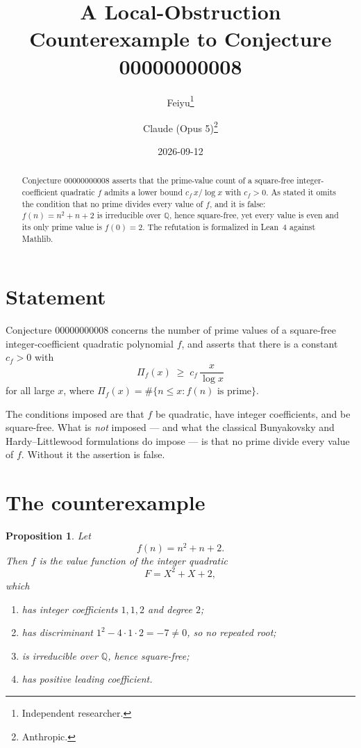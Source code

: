 \documentclass[11pt]{article}
\title{A Local-Obstruction Counterexample to Conjecture 00000000008}
\author{%
  Feiyu\thanks{Independent researcher.}
  \and
  Claude (Opus 5)\thanks{Anthropic.}%
}
\date{2026-09-12}
\theoremstyle{plain}
\newtheorem{proposition}[theorem]{Proposition}
\theoremstyle{remark}
\begin{document}
\maketitle

\begin{abstract}
Conjecture 00000000008 asserts that the prime-value count of a square-free
integer-coefficient quadratic $f$ admits a lower bound $c_f\,x/\log x$ with
$c_f>0$. As stated it omits the condition that no prime divides every value of
$f$, and it is false: $f(n)=n^2+n+2$ is irreducible over $\mathbb Q$, hence
square-free, yet every value is even and its only prime value is $f(0)=2$. The
refutation is formalized in Lean~4 against Mathlib.
\end{abstract}

\section{Statement}

Conjecture 00000000008 concerns the number of prime values of a square-free
integer-coefficient quadratic polynomial $f$, and asserts that there is a
constant $c_f>0$ with
\begin{equation}\label{eq:bound}
  \Pi_f(x)\;\ge\;c_f\,\frac{x}{\log x}
\end{equation}
for all large $x$, where $\Pi_f(x)=\#\{n\le x:f(n)\text{ is prime}\}$.

The conditions imposed are that $f$ be quadratic, have integer coefficients,
and be square-free. What is \emph{not} imposed --- and what the classical
Bunyakovsky and Hardy--Littlewood formulations do impose --- is that no prime
divide every value of $f$. Without it the assertion is false.

\section{The counterexample}

\begin{proposition}\label{prop:hyp}
Let
\[
  f(n)=n^2+n+2 .
\]
Then $f$ is the value function of the integer quadratic
\[
  F=X^2+X+2,
\]
which
\begin{enumerate}
  \item has integer coefficients $1,1,2$ and degree $2$;
  \item has discriminant $1^2-4\cdot1\cdot2=-7\ne0$, so no repeated root;
  \item is irreducible over $\mathbb Q$, hence square-free;
  \item has positive leading coefficient.
\end{enumerate}
\end{proposition}
\end{document}
